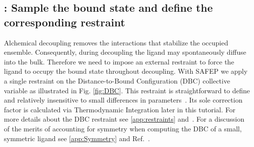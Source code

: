 \documentclass[9pt,tutorial,pubversion]{Styling/livecoms}
\begin{document}
\renewcommand\thesubsection{Step \Alph{subsection}}
\subsection{\hspace{-1em}: Sample the bound state and define the corresponding restraint}\label{step:equilibrium}
    \begin{tcolorbox}[colback=blue!5!white,colframe=blue!75!black] 
    Alchemical decoupling removes the interactions that stabilize the occupied ensemble. 
    Consequently, during decoupling the ligand may spontaneously diffuse into the bulk. 
    Therefore we need to impose an external restraint to force the ligand to occupy the bound state throughout decoupling. 
    With SAFEP we apply a single restraint on the Distance-to-Bound Configuration (DBC) collective variable as illustrated in Fig. \ref{fig:DBC}. 
    This restraint is straightforward to define and relatively insensitive to small differences in parameters~\cite{Salari2018}.
    Its sole correction factor is calculated via Thermodynamic Integration later in this tutorial. 
    For more details about the DBC restraint see \ref{app:restraints} and~\cite{Salari2018}. 
    For a discussion of the merits of accounting for symmetry when computing the DBC of a small, symmetric ligand see \ref{app:Symmetry} and Ref.~.
    \end{tcolorbox}
    
\end{document}
